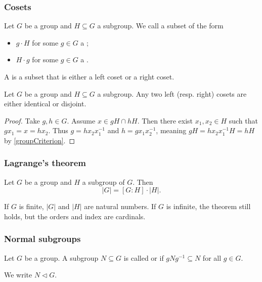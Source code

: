\subsubsection{Cosets}
\begin{definition}
Let $G$ be a group and $H\subseteq G$ a subgroup. We call a subset of the form
\begin{itemize}
\item $g\cdot H$ for some $g\in G$ a ;
\item $H\cdot g$ for some $g\in G$ a .
\end{itemize}
A  is a subset that is either a left coset or a right coset.
\end{definition}

\begin{lemma} \label{differentCosetsDisjoint}
Let $G$ be a group and $H\subseteq G$ a subgroup. Any two left (resp. right) cosets are either identical or disjoint.
\end{lemma}
\begin{proof}
Take $g,h\in G$. Assume $x\in gH\cap hH$. Then there exist $x_1,x_2\in H$ such that $gx_1 = x = hx_2$. Thus $g = hx_2x_1^{-1}$ and $h = gx_1x_2^{-1}$, meaning $gH = hx_2x_1^{-1}H = hH$ by \ref{groupCriterion}.
\end{proof}

\subsubsection{Lagrange's theorem}
\begin{theorem}
Let $G$ be a group and $H$ a subgroup of $G$. Then
\[ |G| = [G:H]\cdot |H|. \]
\end{theorem}
If $G$ is finite, $|G|$ and $|H|$ are natural numbers. If $G$ is infinite, the theorem still holds, but the orders and index are cardinals.

\subsubsection{Normal subgroups}
\begin{definition}
Let $G$ be a group. A subgroup $N\subseteq G$ is called  or  if $gNg^{-1} \subseteq N$ for all $g\in G$.

We write $N \lhd G$.
\end{definition}

